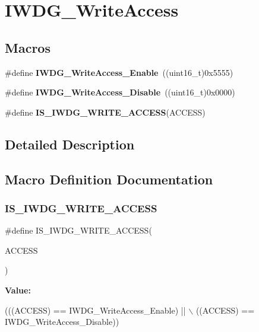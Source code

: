 \section{I\+W\+D\+G\+\_\+\+Write\+Access}
\label{group__IWDG__WriteAccess}
\subsection*{Macros}
\begin{DoxyCompactItemize}
\item 
\#define \textbf{ I\+W\+D\+G\+\_\+\+Write\+Access\+\_\+\+Enable}~((uint16\+\_\+t)0x5555)
\item 
\#define \textbf{ I\+W\+D\+G\+\_\+\+Write\+Access\+\_\+\+Disable}~((uint16\+\_\+t)0x0000)
\item 
\#define \textbf{ I\+S\+\_\+\+I\+W\+D\+G\+\_\+\+W\+R\+I\+T\+E\+\_\+\+A\+C\+C\+E\+SS}(A\+C\+C\+E\+SS)
\end{DoxyCompactItemize}


\subsection{Detailed Description}


\subsection{Macro Definition Documentation}
\mbox{\label{group__IWDG__WriteAccess_gaa89c93332f5977175f8d416b7492de18}} 
\subsubsection{I\+S\+\_\+\+I\+W\+D\+G\+\_\+\+W\+R\+I\+T\+E\+\_\+\+A\+C\+C\+E\+SS}
{\footnotesize\ttfamily \#define I\+S\+\_\+\+I\+W\+D\+G\+\_\+\+W\+R\+I\+T\+E\+\_\+\+A\+C\+C\+E\+SS(\begin{DoxyParamCaption}\item[{}]{A\+C\+C\+E\+SS }\end{DoxyParamCaption})}

{\bfseries Value\+:}
\begin{DoxyCode}
(((ACCESS) == IWDG_WriteAccess_Enable) || \(\backslash\)
                                      ((ACCESS) == IWDG_WriteAccess_Disable))
\end{DoxyCode}


